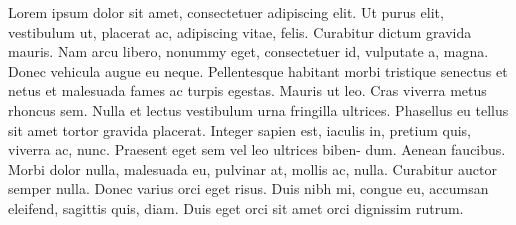 Lorem ipsum dolor sit amet, consectetuer adipiscing elit. Ut purus elit, vestibulum ut,
placerat ac, adipiscing vitae, felis. Curabitur dictum gravida mauris. Nam arcu libero,
nonummy eget, consectetuer id, vulputate a, magna. Donec vehicula augue eu neque.
Pellentesque habitant morbi tristique senectus et netus et malesuada fames ac turpis
egestas. Mauris ut leo. Cras viverra metus rhoncus sem. Nulla et lectus vestibulum urna
fringilla ultrices. Phasellus eu tellus sit amet tortor gravida placerat. Integer sapien
est, iaculis in, pretium quis, viverra ac, nunc. Praesent eget sem vel leo ultrices
biben- dum. Aenean faucibus. Morbi dolor nulla, malesuada eu, pulvinar at, mollis ac,
nulla. Curabitur auctor semper nulla. Donec varius orci eget risus. Duis nibh mi,
congue eu, accumsan eleifend, sagittis quis, diam. Duis eget orci sit amet orci
dignissim rutrum.
